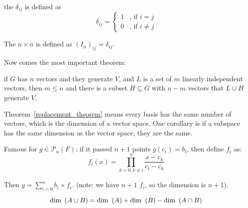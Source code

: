 \begin{definition}
	the   $\delta_{ij}$ is defined as 
	\begin{equation}
		\delta_{ij} = \begin{cases}
			1 & \text{, if } i = j \\
			0 & \text{, if } i \neq j
 		\end{cases}
	\end{equation}
\end{definition}

\begin{definition}
	The $n\times n$   is defined as $\left(I_n \right)_{ij} = \delta_{ij}$.
\end{definition}


Now comes the most important theorem:
\begin{theorem}\label{replacement_theorem}
    if $G$ has $n$ vectors and they generate $V$, and $L$ is a set of $m$ linearly independent vectors, then $m \leq n$ and there is a subset $H \subseteq G$ with $n-m$ vectors that $L \cup H $ generate $V$.
    
\end{theorem}

Theorem~\ref{replacement_theorem} means every basis has the same number of vectors, which is the dimension of a vector space. One corollary is if a subspace has the same dimension as the vector space, they are the same.


\begin{example}
   Famous  for $g \in \mathcal{P}_n (F)$: if it passed $n+1$ points $g(c_i) = b_i$, then define $f_i$ as:
\begin{equation}
    f_i(x) = \prod_{k=0,k \neq i}^{n} \frac{x - c_k}{c_i - c_k}
\end{equation}

Then $g = \sum_{i=0}^{n} b_i \times f_i $. (note: we have $n+1$ $f_i$, so the dimension is $n+1$). 
\end{example}

\begin{theorem}
    \begin{equation}
        \displaystyle \mathrm{dim}~\left( A\cup B \right) = \displaystyle \mathrm{dim}~\left( A \right) + \displaystyle \mathrm{dim}~\left( B \right) - \displaystyle \mathrm{dim}~\left( A \cap B \right)
    \end{equation}    
\end{theorem}



